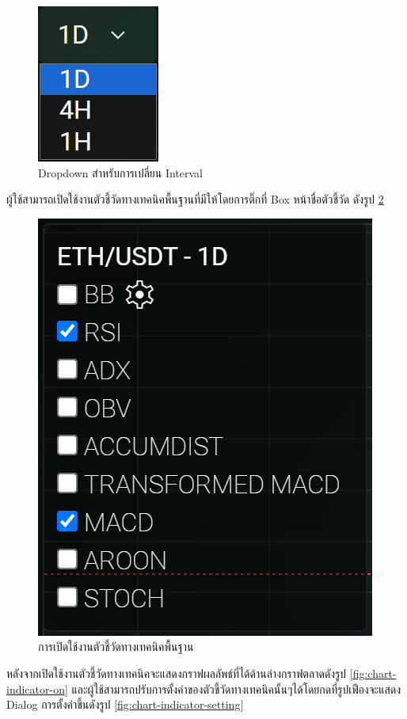 \begin{figure}[ht]
    \centering
    \includegraphics[scale=0.75]{images/web-tuts/chart-interval-dd.PNG}
    \caption{Dropdown สำหรับการเปลี่ยน Interval}
    \label{fig:chart-interval-dd}
\end{figure}
\FloatBarrier
ผู้ใช้สามารถเปิดใช้งานตัวชี้วัดทางเทคนิคพื้นฐานที่มีให้โดยการติ๊กที่ Box หน้าชื่อตัวชี้วัด ดังรูป \ref{fig:chart-indicators-selector}
\begin{figure}[ht]
    \centering
    \includegraphics[scale=0.5]{images/web-tuts/chart-indicator-selector.PNG}
    \caption{การเปิดใช้งานตัวชี้วัดทางเทคนิคพื้นฐาน}
    \label{fig:chart-indicators-selector}
\end{figure}
\FloatBarrier
หลังจากเปิดใช้งานตัวชี้วัดทางเทคนิคจะแสดงกราฟผลลัพธ์ที่ได้ด้านล่างกราฟตลาดดังรูป \ref{fig:chart-indicator-on} และผู้ใช้สามารถปรับการตั้งค่าของตัวชี้วัดทางเทคนิคนั้นๆได้โดยกดที่รูปเฟืองจะแสดง Dialog การตั้งค่าขึ้นดังรูป \ref{fig:chart-indicator-setting}
